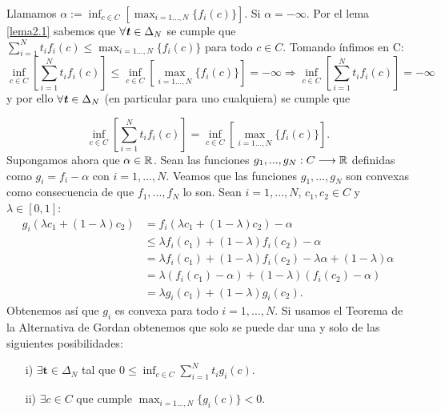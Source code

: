 Llamamos $ \alpha := \inf_{ c\in C}\left[\max_{i=1\dots,N } \{f_i(c)\} \right] $. Si $ \alpha = -\infty $. Por el lema \ref{lema2.1} sabemos que $ \forall \textbf{\emph{t}} \in \Delta_N $ se cumple que $ \sum_{i=1}^{N} t_i f_i(c) \leq \max_{i=1\dots,N } \{f_i(c)\}$ para todo $ c \in C$. Tomando ínfimos en C:
\[
\inf_{c \in C}\left[ \sum_{i=1}^{N} t_i f_i(c) \right] \leq \inf_{ c\in C}\left[\max_{i=1\dots,N } \{f_i(c)\} \right] = -\infty \Longrightarrow \inf_{ c \in C}\left[ \sum_{i=1}^{N} t_i f_i (c)\right] = -\infty 
\]
y por ello $ \forall \textbf{\emph{t}} \in \Delta_N $ (en particular para uno cualquiera) se cumple que

\[
\inf_{c \in C}\left[ \sum_{i=1}^{N} t_i f_i (c) \right] = \inf_{ c\in C}\left[\max_{i=1\dots,N } \{f_i(c)\} \right]. \]
Supongamos ahora que $ \alpha \in \mathbb{R} $. Sean las funciones $ g_1, ..., g_N: C \longrightarrow \mathbb{R} $ definidas como $ g_i = f_i - \alpha $ con $ i=1,...,N$. Veamos que las funciones $ g_1, ..., g_N $ son convexas como consecuencia de que $ f_1, ..., f_N $ lo son. Sean $ i = 1, \dots, N $, $ c_1,c_2 \in C $ y $ \lambda \in \left[0,1\right] $:
\begin{equation*}
\begin{split}
g_i(\lambda c_1 + (1-\lambda) c_2) &= f_i(\lambda c_1 + (1-\lambda) c_2) - \alpha \\
&\leq \lambda f_i(c_1) + (1-\lambda)f_i(c_2) - \alpha \\
&= \lambda f_i(c_1) + (1-\lambda)f_i(c_2) - \lambda \alpha + (1-\lambda)\alpha \\
&= \lambda( f_i(c_1) - \alpha ) + (1-\lambda) (f_i (c_2) - \alpha) \\
&= \lambda g_i(c_1) + (1-\lambda) g_i (c_2).
\end{split}
\end{equation*}
Obtenemos así que $ g_i $ es convexa para todo $ i = 1, ..., N $. Si usamos el Teorema de la Alternativa de Gordan obtenemos que solo se puede dar una y solo de las siguientes posibilidades:

\begin{itemize}
	\item[i)] $ \exists \mathbf{t} \in \Delta_N $ tal que $ 0 \leq \inf_{c \in C}  \sum_{i=1}^{N}{t_i g_i (c)}$.
	\item[ii)] $ \exists c \in C $ que cumple $ \max_{i=1\dots,N } \{g_i(c)\}  < 0 $.
\end{itemize}

